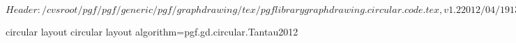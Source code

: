 %
%
%

\ProvidesFileRCS[v\pgfversion] $Header: /cvsroot/pgf/pgf/generic/pgf/graphdrawing/tex/pgflibrarygraphdrawing.circular.code.tex,v 1.2 2012/04/19 13:49:07 tantau Exp $





%
%
\pgfgddeclarealgorithmkey
  {circular layout}
  {circular layout}
  {algorithm=pgf.gd.circular.Tantau2012}



\endinput